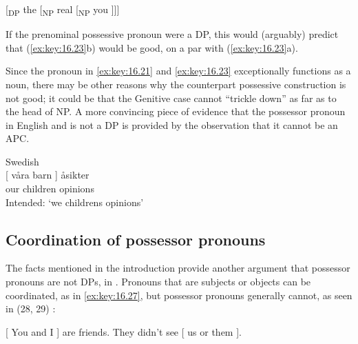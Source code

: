 \documentclass[output=paper]{langsci/langscibook}
\begin{document}
\ea\label{ex:key:16.24}
    {}[\textsubscript{DP} the [\textsubscript{NP} real [\textsubscript{NP} you ]]]
\z

If the prenominal possessive pronoun were a DP, this would (arguably) predict
that (\ref{ex:key:16.23}b) would be good, on a par with (\ref{ex:key:16.23}a).

Since the pronoun in \eqref{ex:key:16.21} and \eqref{ex:key:16.23}
exceptionally functions as a noun, there may be other reasons why the
counterpart possessive construction is not good; it could be that the
Genitive case cannot \enquote{trickle down} as far as to the
head of NP. A more convincing piece of evidence that the possessor pronoun in
English and  is not a DP is provided by the observation that it cannot
be an APC.

\ea Swedish\\\label{ex:key:16.25}
    \gll \llap{*}{}[ våra barn ] åsikter\\
        {} our  children {} opinions\\
    \glt Intended: `we childrens opinions'
\z

\label{ex:key:16.26}
\z

\subsection{Coordination of possessor pronouns}\label{sec:key:16.3.2}

The   facts mentioned in the introduction provide another
argument that possessor pronouns are not DPs, in . Pronouns that are
subjects or objects can be coordinated, as in \eqref{ex:key:16.27}, but possessor pronouns
generally cannot, as seen in (28, 29) \parencite[601--602]{QuirkEtAl1972}:

\ea\label{ex:key:16.27}
    {}[ You and I ] are friends. They didn’t see [ us or them ].
\z

\ea\label{ex:key:16.28}
	\z
\z

\ea\label{ex:key:16.29}
	\z
\z\largerpage[-4]
\end{document}
